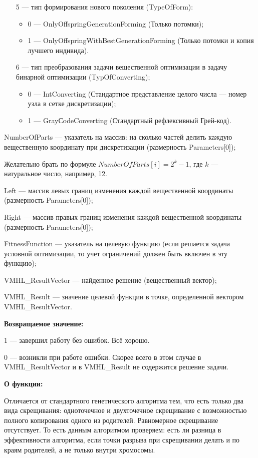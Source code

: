 \documentclass[a4paper,12pt]{article}
\begin{document}
\begin{itemize}
 \item [5] --- тип формирования нового поколения (TypeOfForm):
  \begin{itemize}
       \item 0 --- OnlyOffspringGenerationForming (Только потомки);
 
       \item 1 --- OnlyOffspringWithBestGenerationForming (Только потомки и копия лучшего индивида).
	    \end{itemize}
 \item [6] --- тип преобразования задачи вещественной оптимизации в задачу бинарной оптимизации (TypOfConverting);
   \begin{itemize}
        \item 0 --- IntConverting (Стандартное представление целого числа –-- номер узла в сетке дискретизации);
        \item 1 --- GrayСodeConverting (Стандартный рефлексивный Грей-код).
			    \end{itemize}
 \end{itemize}
 
 NumberOfParts --- указатель на массив: на сколько частей делить каждую вещественную координату при дискретизации (размерность Parameters[0]);
 
  Желательно брать по формуле $NumberOfParts[i]=2^k-1$, где $k$ --- натуральное число, например, 12.
  
 Left --- массив левых границ изменения каждой вещественной координаты (размерность Parameters[0]);
 
 Right --- массив правых границ изменения каждой вещественной координаты (размерность Parameters[0]);
 
 FitnessFunction --- указатель на целевую функцию (если решается задача условной оптимизации, то учет ограничений должен быть включен в эту функцию);
 
 VMHL\_ResultVector --- найденное решение (вещественный вектор);
 
 VMHL\_Result --- значение целевой функции в точке, определенной вектором VMHL\_ResultVector.

\textbf{Возвращаемое значение:} 

 1 --- завершил работу без ошибок. Всё хорошо.
 
 0 --- возникли при работе ошибки. Скорее всего в этом случае в VMHL\_ResultVector и в VMHL\_Result не содержится решение задачи.

\textbf{О функции:}

Отличается от стандартного генетического алгоритма тем, что есть только два вида скрещивания: одноточечное и двухточечное скрещивание с возможностью полного копирования одного из родителей. Равномерное скрещивание отсутствует. То есть данным алгоритмом проверяем: есть ли разница в эффективности алгоритма, если точки разрыва при скрещивании делать и по краям родителей, а не только внутри хромосомы.
\end{document}
